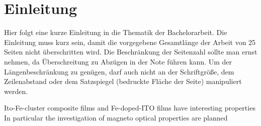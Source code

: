 \chapter{Einleitung}
Hier folgt eine kurze Einleitung in die Thematik der Bachelorarbeit.
Die Einleitung muss kurz sein, damit die vorgegebene Gesamtlänge der 
Arbeit von 25 Seiten nicht überschritten wird. 
Die Beschränkung der Seitenzahl sollte man ernst nehmen,
da Überschreitung zu Abzügen in der Note führen kann. 
Um der Längenbeschränkung zu genügen, darf auch nicht an der Schriftgröße,
dem Zeilenabstand oder dem Satzspiegel (bedruckte Fläche der Seite) manipuliert werden.

Ito-Fe-cluster composite films and Fe-doped-ITO films have interesting properties \cite{Peng.2005, Ohno.2007, Shen.2015}
In particular the investigation of magneto optical properties are planned 

